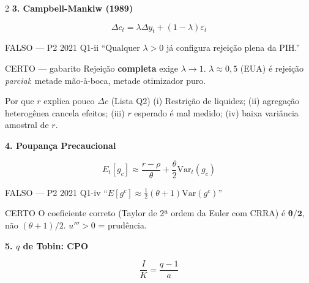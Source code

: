 \documentclass[10pt, a4paper]{article}
\begin{document}
\begin{multicols}{2}
\vspace{0.5em}
\textbf{\color{azul}\large 3. Campbell-Mankiw (1989)}

\begin{formulabox}
\[\Delta c_t = \lambda \Delta y_t + (1-\lambda)\varepsilon_t\]
\end{formulabox}

\begin{errobox}{FALSO --- P2 2021 Q1-ii}
``Qualquer $\lambda>0$ já configura rejeição plena da PIH.''
\end{errobox}
\vspace{0.3em}
\begin{certobox}{CERTO --- gabarito}
Rejeição \textbf{completa} exige $\lambda\to1$. $\lambda\approx0{,}5$ (EUA) é
rejeição \emph{parcial}: metade mão-à-boca, metade otimizador puro.
\end{certobox}

\begin{certobox}{Por que $r$ explica pouco $\Delta c$ (Lista Q2)}
(i) Restrição de liquidez; (ii) agregação heterogênea cancela efeitos;
(iii) $r$ esperado é mal medido; (iv) baixa variância amostral de $r$.
\end{certobox}

\columnbreak
\textbf{\color{azul}\large 4. Poupança Precaucional}

\begin{formulabox}
\[E_t[g_c] \approx \frac{r-\rho}{\theta} + \frac{\theta}{2}\mathrm{Var}_t(g_c)\]
\end{formulabox}

\begin{errobox}{FALSO --- P2 2021 Q1-iv}
``$E[g^c] \approx \tfrac{1}{2}(\theta+1)\mathrm{Var}(g^c)$''
\end{errobox}
\vspace{0.3em}
\begin{certobox}{CERTO}
O coeficiente correto (Taylor de 2ª ordem da Euler com CRRA) é
$\boldsymbol{\theta/2}$, não $(\theta+1)/2$. $u'''>0$ = prudência.
\end{certobox}

\vspace{0.5em}
\textbf{\color{azul}\large 5. $q$ de Tobin: CPO}

\begin{formulabox}
\[\frac{I}{K} = \frac{q-1}{a}\]
\end{formulabox}


\end{multicols}
\end{document}
